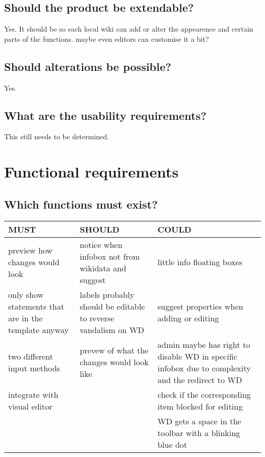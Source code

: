 \documentclass{article}
\begin{document}
\subsection{Should the product be extendable?}

Yes. It should be so each local wiki can add or alter the appearence and certain parts of the functions. maybe even editors can customise it a bit?

\subsection{Should alterations be possible?}

Yes.

\subsection{What are the usability requirements?}

This still needs to be determined.


\section{Functional requirements}

\subsection{Which functions must exist?}


\begin{tabular}{| >{\raggedright\arraybackslash}p{4cm} | >{\raggedright\arraybackslash}p{4cm} | >{\raggedright\arraybackslash}p{4cm} |}
  \hline
  \textbf{MUST} & \textbf{SHOULD} & \textbf{COULD}  \\ \hline
  preview how changes would look & notice when infobox not from wikidata and suggest & little info floating boxes \\ \hline
  only show statements that are in the template anyway & labels probably should be editable to reverse vandalism on WD & suggest properties when adding or editing \\ \hline
  two different input methods & prevew of what the changes would look like & admin maybe has right to disable WD in specific infobox due to complexity and the redirect to WD \\ \hline
  integrate with visual editor &  & check if the corresponding item blocked for editing \\ \hline
   &  & WD gets a space in the toolbar with a blinking blue dot \\ \hline
\end{tabular}
\end{document}
